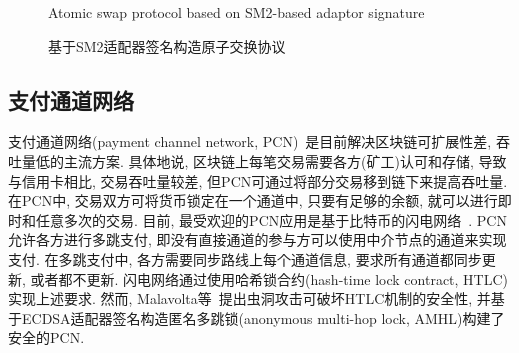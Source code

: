 \documentclass[review]{jcr}
\begin{document}
\begin{figure*}[!h]
\begin{center}
\caption{基于SM2适配器签名构造原子交换协议}{Atomic swap protocol based on SM2-based adaptor signature}
\label{Atomic swap protocol based on SM2-based adaptor signature}
\end{center}
\end{figure*}

\subsection{支付通道网络}
支付通道网络(payment channel network, PCN)~\cite{DeckerW15,PD2016,PC2018,MalavoltaMSKM19,AumayrEEFHMMR20}是目前解决区块链可扩展性差, 吞吐量低的主流方案. 具体地说, 区块链上每笔交易需要各方(矿工)认可和存储, 导致与信用卡相比, 交易吞吐量较差, 但PCN可通过将部分交易移到链下来提高吞吐量. 在PCN中, 交易双方可将货币锁定在一个通道中, 只要有足够的余额, 就可以进行即时和任意多次的交易. 目前, 最受欢迎的PCN应用是基于比特币的闪电网络~\cite{PD2016}. PCN允许各方进行多跳支付, 即没有直接通道的参与方可以使用中介节点的通道来实现支付. 在多跳支付中, 各方需要同步路线上每个通道信息, 要求所有通道都同步更新, 或者都不更新. 闪电网络通过使用哈希锁合约(hash-time lock contract, HTLC)实现上述要求. 然而, Malavolta等~\cite{MalavoltaMSKM19}提出虫洞攻击可破坏HTLC机制的安全性, 并基于ECDSA适配器签名构造匿名多跳锁(anonymous multi-hop lock, AMHL)构建了安全的PCN.
\end{document}
